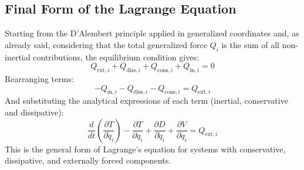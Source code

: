\subsection{Final Form of the Lagrange Equation}

Starting from the D'Alembert principle applied in generalized coordinates and, as already said, considering that the total generalized force \( Q_i \) is the sum of all non-inertial contributions, the equilibrium condition gives:
\[
Q_{\text{ext},i} + Q_{\text{diss},i} + Q_{\text{cons},i} + Q_{\text{in},i} = 0
\]
Rearranging terms:
\[
- Q_{\text{in},i} - Q_{\text{diss},i} - Q_{\text{cons},i} = Q_{\text{ext},i}
\]
And substituting the analytical expressions of each term (inertial, conservative and dissipative):
\[
\frac{d}{dt} \left( \frac{\partial T}{\partial \dot{q}_i} \right)
- \frac{\partial T}{\partial q_i}
+ \frac{\partial D}{\partial \dot{q}_i}
+ \frac{\partial V}{\partial q_i}
= Q_{\text{ext},i}
\]
This is the general form of Lagrange’s equation for systems with conservative, dissipative, and externally forced components.
